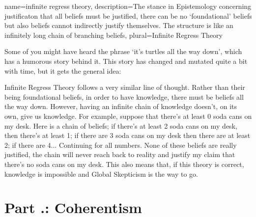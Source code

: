 {
name=infinite regress theory,
description={The stance in Epistemology concerning justificaton that all beliefs must be justified, there can be no `foundational' beliefs but also beliefs cannot indirectly justify themselves. The structure is like an infinitely long chain of branching beliefs},
plural=Infinite Regress Theory
}


Some of you might have heard the phrase `it's turtles all the way down', which has a humorous story behind it.  This story has changed and mutated quite a bit with time, but it gets the general idea:


Infinite Regress Theory follows a very similar line of thought. Rather than their being foundational beliefs, in order to have knowledge, there must be beliefs all the way down.  However, having an infinite chain of knowledge doesn't, on its own, give us knowledge. For example, suppose that there's at least 0 soda cans on my desk. Here is a chain of beliefs; if there's at least 2 soda cans on my desk, then there's at least 1; if there are 3 soda cans on my desk then there are at least 2; if there are 4... Continuing for all numbers. None of these beliefs are really justified,  the chain will never reach back to reality and justify my claim that there's no soda cans on my desk. This also means that, if this theory is correct, knowledge is impossible and Global Skepticism is the way to go. 

\section{Part \thechapcount.\theseccount: Coherentism}

